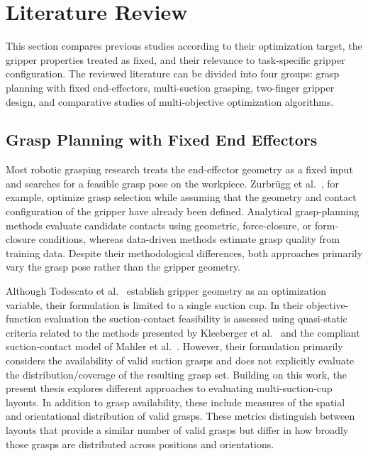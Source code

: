 \chapter{Literature Review}
\label{sec:lit_review}

This section compares previous studies according to their optimization target, the gripper properties treated as fixed, and their relevance to
task-specific gripper configuration. The reviewed literature can be divided into four groups: grasp planning with fixed end-effectors, multi-suction
grasping, two-finger gripper design, and comparative studies of multi-objective optimization algorithms.

\section{Grasp Planning with Fixed End Effectors}

Most robotic grasping research treats the end-effector geometry as a fixed input and searches for a feasible grasp pose on the workpiece. Zurbr\"ugg
et al.\ \cite{Zurbruegg2025GraspQP}, for example, optimize grasp selection while assuming that the geometry and contact configuration of the gripper
have already been defined. Analytical grasp-planning methods evaluate candidate contacts using geometric, force-closure, or form-closure conditions,
whereas data-driven methods estimate grasp quality from training data. Despite their methodological differences, both approaches primarily vary the
grasp pose rather than the gripper geometry.

Although Todescato et al.\ \cite{Todescato} establish gripper geometry as an optimization variable, their formulation is limited to a single suction
cup. In their objective-function evaluation the suction-contact feasibility is assessed
using quasi-static criteria related to the methods presented by Kleeberger et al.\ \cite{Kleeberger} and the compliant suction-contact model of
Mahler et al.\ \cite{SC_quasi_static}. However, their formulation primarily considers the availability of valid suction grasps and does not explicitly
evaluate the distribution/coverage of the resulting grasp set. Building on this work, the present thesis explores different approaches
to evaluating multi-suction-cup layouts. In addition to grasp
availability, these include measures of the spatial and orientational
distribution of valid grasps. These metrics distinguish
between layouts that provide a similar number of valid grasps but differ in how broadly those grasps are distributed across positions and
orientations.

